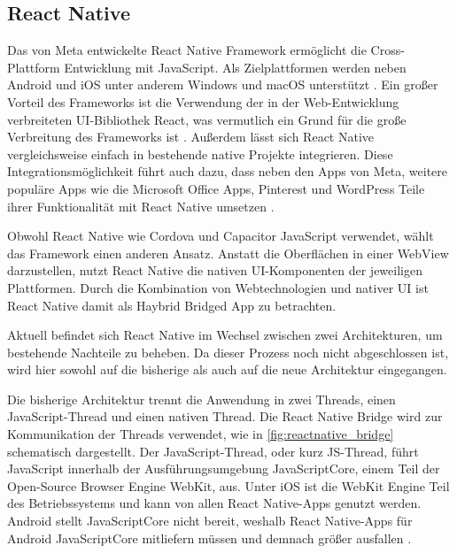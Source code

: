 \subsection{React Native}
\label{sec:frameorks_reactnative}

Das von Meta entwickelte React Native Framework ermöglicht die Cross-Plattform Entwicklung mit JavaScript.
Als Zielplattformen werden neben Android und iOS unter anderem Windows und macOS unterstützt \cite{ReactNative}.
Ein großer Vorteil des Frameworks ist die Verwendung der in der Web-Entwicklung verbreiteten \ac{UI}-Bibliothek React, was vermutlich ein Grund für die große Verbreitung des Frameworks ist \cite{Appfigures_TopSDKs,Stackoverflow_2022}.
Außerdem lässt sich React Native vergleichsweise einfach in bestehende native Projekte integrieren.
Diese Integrationsmöglichkeit führt auch dazu, dass neben den Apps von Meta, weitere populäre Apps wie die Microsoft Office Apps, Pinterest und WordPress Teile ihrer Funktionalität mit React Native umsetzen \cite{ReactNative_Showcase}.


Obwohl React Native wie Cordova und Capacitor JavaScript verwendet, wählt das Framework einen anderen Ansatz.
Anstatt die Oberflächen in einer WebView darzustellen, nutzt React Native die nativen \ac{UI}-Komponenten der jeweiligen Plattformen.
Durch die Kombination von Webtechnologien und nativer \ac{UI} ist React Native damit als Haybrid Bridged App zu betrachten.


Aktuell befindet sich React Native im Wechsel zwischen zwei Architekturen, um bestehende Nachteile zu beheben.
Da dieser Prozess noch nicht abgeschlossen ist, wird hier sowohl auf die bisherige als auch auf die neue Architektur eingegangen.


Die bisherige Architektur trennt die Anwendung in zwei Threads, einen JavaScript-Thread und einen nativen Thread.
Die React Native Bridge wird zur Kommunikation der Threads verwendet, wie in \autoref{fig:reactnative_bridge} schematisch dargestellt.
Der JavaScript-Thread, oder kurz JS-Thread, führt JavaScript innerhalb der Ausführungsumgebung JavaScriptCore, einem Teil der Open-Source Browser Engine WebKit, aus.
Unter iOS ist die WebKit Engine Teil des Betriebssystems und kann von allen React Native-Apps genutzt werden.
Android stellt JavaScriptCore nicht bereit, weshalb React Native-Apps für Android JavaScriptCore mitliefern müssen und demnach größer ausfallen \cite{Dragomir_ReactNative,Nawrocki_Comparison_Hybrid_Native_Frameworks}.


